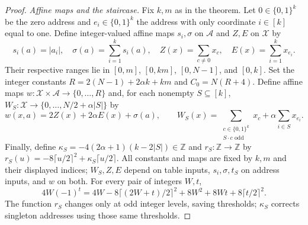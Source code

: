 \documentclass[11pt]{article}
\newcommand{\bits}{\{0,1\}}
\begin{document}
\begin{proof}
\emph{Affine maps and the staircase.}
Fix $k,m$ as in the theorem. Let $0\in\bits^k$ be the zero address and
$e_i\in\bits^k$ the address with only coordinate $i\in[k]$ equal to one.
Define integer-valued affine maps $s_i,\sigma$ on $\mathcal A$ and
$Z,E$ on $\mathcal X$ by
$$s_i(a)=|a_i|,\quad \sigma(a)=\sum_{i=1}^k s_i(a),\quad
Z(x)=\sum_{c\ne0}x_c,\quad E(x)=\sum_{i=1}^k x_{e_i}.$$
Their respective ranges lie in $[0,m]$, $[0,km]$, $[0,N-1]$, and $[0,k]$.
Set the integer constants $R=2(N-1)+2\alpha k+km$ and $C_0=N(R+4)$.
Define affine maps $w:\mathcal X\times\mathcal A\to\{0,\ldots,R\}$ and,
for each nonempty $S\subseteq[k]$,
$W_S:\mathcal X\to\{0,\ldots,N/2+\alpha|S|\}$ by
$$w(x,a)=2Z(x)+2\alpha E(x)+\sigma(a),\qquad
W_S(x)=\sum_{\substack{c\in\bits^k\\S\cdot c\text{ odd}}}x_c
       +\alpha\sum_{i\in S}x_{e_i}.$$
Finally, define $\kappa_S=-4(2\alpha+1)(k-2|S|)\in\mathbb Z$ and
$r_S:\mathbb Z\to\mathbb Z$ by
$r_S(u)=-8\lceil u/2\rceil^2+\kappa_S\lceil u/2\rceil$.
All constants and maps are fixed by $k,m$ and their displayed indices;
$W_S,Z,E$ depend on table inputs, $s_i,\sigma,t_S$ on address inputs,
and $w$ on both. For every pair of integers $W,t$,
$$4W(-1)^t=4W-8\lceil(2W+t)/2\rceil^2+8W^2+8Wt+8\lceil t/2\rceil^2.$$
The function $r_S$ changes only at odd integer levels, saving thresholds;
$\kappa_S$ corrects singleton addresses using those same thresholds.


\end{proof}
\end{document}
